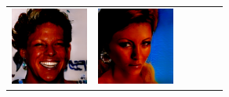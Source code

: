 \documentclass{article}
\newcommand{\pganw}{1.0in}
\begin{document}
\begin{table}[htbp]
\begin{center}
\begin{tabular}{cc|cc|cc}
\includegraphics[width=\pganw]{figures/pgan/6_base_raw_reject.png} &
\includegraphics[width=\pganw]{figures/pgan/7_base_raw_base.png} &

\end{tabular}
\end{center}
\end{table}
\end{document}
